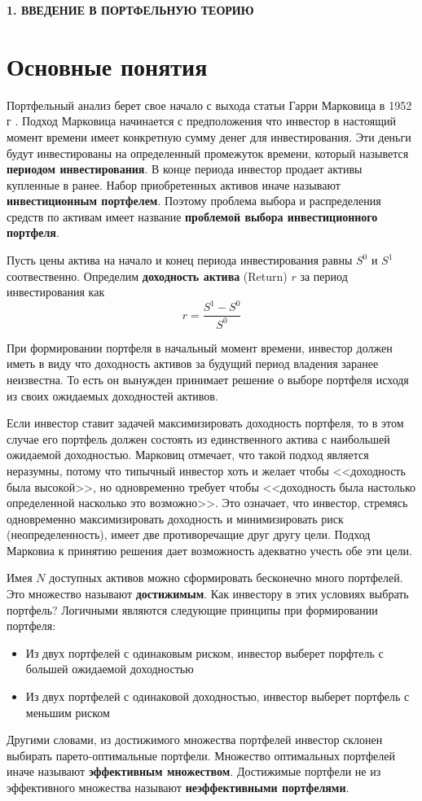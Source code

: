 \newpage
\begin{center}
	\textbf{\large 1. ВВЕДЕНИЕ В ПОРТФЕЛЬНУЮ ТЕОРИЮ}
\end{center}

\section{Основные понятия}

Портфельный анализ берет свое начало с выхода статьи Гарри Марковица в 1952 г \cite{markowitz}. Подход Марковица начинается с предположения что инвестор в 
настоящий момент времени имеет конкретную сумму денег для инвестирования. Эти деньги будут инвестированы на определенный промежуток
времени, который назывется \textbf{периодом инвестирования}. В конце периода инвестор продает активы купленные в
ранее. 
Набор приобретенных активов иначе называют \textbf{инвестиционным портфелем}. Поэтому проблема выбора и распределения
средств по активам имеет название \textbf{проблемой выбора инвестиционного портфеля}.

Пусть цены актива на начало и конец периода инвестирования равны $S^0$ и $S^1$ соотвественно.
Определим \textbf{доходность актива} (Return) $r$ за период инвестирования как
\[
	r = \frac{S^1 - S^0}{S^0}
\]

При формировании портфеля в начальный момент времени, инвестор должен иметь в виду что доходность активов
за будущий период владения заранее неизвестна. То есть он вынужден принимает решение о выборе портфеля исходя из 
своих ожидаемых доходностей активов. 

Если инвестор ставит задачей максимизировать доходность портфеля, то в этом случае его портфель должен состоять из единственного
актива с наибольшей ожидаемой доходностью. Марковиц отмечает, что такой подход является неразумны, потому что типычный инвестор
хоть и желает чтобы <<доходность была высокой>>, но одновременно требует чтобы <<доходность была настолько определенной насколько
это возможно>>. Это означает, что инвестор, стремясь одновременно максимизировать доходность и минимизировать риск 
(неопределенность), имеет две противоречащие друг другу цели. Подход Марковиа к принятию решения дает возможность адекватно 
учесть обе эти цели.

Имея $N$ доступных активов можно сформировать бесконечно много портфелей. Это множество называют \textbf{достижимым}. 
Как инвестору в этих условиях выбрать портфель? Логичными являются следующие принципы при формировании портфеля:
\begin{itemize}
	\item Из двух портфелей с одинаковым риском, инвестор выберет порфтель с большей ожидаемой доходностью
	\item Из двух портфелей с одинаковой доходностью, инвестор выберет портфель с меньшим риском
\end{itemize}
Другими словами, из достижимого множества портфелей инвестор склонен выбирать парето-оптимальные портфели.
Множество оптимальных портфелей иначе называют \textbf{эффективным множеством}. Достижимые портфели не из 
эффективного множества называют \textbf{неэффективными портфелями}.


